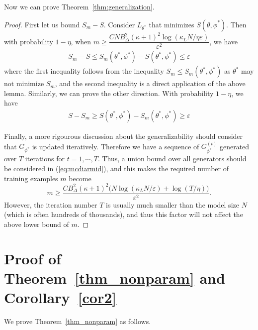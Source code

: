 \documentclass[11pt,fullpage, letterpaper,twoside]{article}
\newcommand{\1}[1]{\mathds{1}_{\left[#1\right]}}
\begin{document}
Now we can prove Theorem~\ref{thm:generalization}.
\begin{proof}
First let us bound $S_m-S$.  Consider $L_{\theta^*}$ that minimizes $S(\theta,\phi^*)$. Then with probability $1-\eta$, when $m\geq\dfrac{C N B_\Delta^2(\kappa+1)^2\log(\kappa_L N/\eta\varepsilon)}{\varepsilon^2}$, we have
\[
\begin{aligned}
S_m - S \leq S_m(\theta^*,\phi^*) - S(\theta^*,\phi^*)\leq\varepsilon
\end{aligned}
\]
where the first inequality follows from the inequality $S_m\leq S_m(\theta^*,\phi^*)$ as $\theta^*$ may not minimize $S_m$, and the second inequality is a direct application of the above lemma.
Similarly, we can prove the other direction. With probability $1-\eta$, we have
\[
\begin{aligned}
S - S_m \geq S(\theta^*,\phi^*)- S_m(\theta^*,\phi^*) \geq\varepsilon
\end{aligned}
\]



Finally, a more rigourous discussion about the generalizability should consider that $G_{\phi^*}$ is updated iteratively. Therefore we have a sequence of $G_{\phi^*}^{(t)}$ generated over $T$ iterations for $t=1,\cdots,T$.  Thus, a union bound over all generators should be considered in (\ref{eq:mcdiarmid}), and this makes the required number of training examples $m$ become
$$
m\geq\dfrac{C B_\Delta^2(\kappa+1)^2 \big(N \log(\kappa_L N/\varepsilon)+\log(T/\eta)\big)}{\varepsilon^2}.
$$
However, the iteration number $T$ is usually much smaller than the model size $N$ (which is often hundreds of thousands), and thus this factor will not affect the above lower bound of $m$.
\end{proof}






\section{Proof of Theorem~\ref{thm_nonparam} and Corollary~\ref{cor2}}\label{proof_b}
We prove Theorem~\ref{thm_nonparam} as follows.
\end{document}
